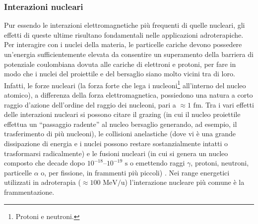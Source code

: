 \documentclass[12pt,a4paper,twoside]{report}
\begin{document}
	\subsubsection{Interazioni nucleari}\label{par:interazioni_nucleari}
	Pur essendo le interazioni elettromagnetiche più frequenti di quelle nucleari, gli effetti di queste ultime risultano fondamentali nelle applicazioni adroterapiche. Per interagire con i nuclei della materia, le particelle cariche devono possedere un'energia sufficientemente elevata da consentire un superamento della barriera di potenziale coulombiana dovuta alle cariche di elettroni e protoni, per fare in modo che i nuclei del proiettile e del bersaglio siano molto vicini tra di loro. Infatti, le forze nucleari (la forza forte che lega i nucleoni\footnote{Protoni e neutroni.} all'interno del nucleo atomico), a differenza della forza elettromagnetica, possiedono una natura a corto raggio d'azione dell'ordine del raggio dei nucleoni, pari a $\approx1\mbox{ fm}$. Tra i vari effetti delle interazioni nucleari si possono citare il grazing (in cui il nucleo proiettile effettua un ``passaggio radente'' al nucleo bersaglio generando, ad esempio, il trasferimento di più nucleoni), le collisioni anelastiche (dove vi è una grande dissipazione di energia e i nuclei possono restare sostanzialmente intatti o trasformarsi radicalmente) e le fusioni nucleari (in cui si genera un nucleo composto che decade dopo $10^{-18}$--$10^{-19}\mbox{ s}$ o emettendo raggi $\gamma$, protoni, neutroni, particelle $\alpha$ o, per fissione, in frammenti più piccoli) \cite{treccani_ioni_pesanti}. Nei range energetici utilizzati in adroterapia ($\approx100\mbox{ MeV/u}$) l'interazione nucleare più comune è la frammentazione.
	
\end{document}
